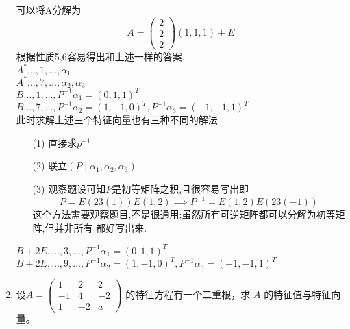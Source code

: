 \documentclass[12pt, a4paper, oneside, UTF8]{ctexbook}
\begin{document}
\begin{enumerate}
    \begin{solution}[分解为秩为1]
        可以将A分解为
        $$
        A=\begin{pmatrix}
            2 \\
            2 \\
            2
        \end{pmatrix}(1,1,1)+E
        $$
        根据性质5,6容易得出和上述一样的答案. \\  
        $A^*\ldots,1,\ldots,\alpha_1$ \\
        $A^*\ldots,7,\ldots,\alpha_2,\alpha_3$  \\
        $B\ldots,1,\ldots,P^{-1}\alpha_1=(0,1,1)^{T}$ \\
        $B\ldots,7,\ldots,P^{-1}\alpha_2=(1,-1,0)^T,P^{-1}\alpha_3=(-1,-1,1)^T$ \\ 
        此时求解上述三个特征向量也有三种不同的解法 
        \begin{enumerate}
            \item [(1)] 直接求$p^{-1}$
            \item [(2)] 联立$(P\mid \alpha_1,\alpha_2,\alpha_3)$ 
            \item [(3)] 观察题设可知$P$是初等矩阵之积,且很容易写出即
            $$
            P = E(23(1))E(1,2) \implies P^{-1}=E(1,2)E(23(-1))
            $$
            这个方法需要观察题目,不是很通用;虽然所有可逆矩阵都可以分解为初等矩阵,但并非所有
            都好写出来.
        \end{enumerate}
        $B+2E,\ldots,3,\ldots,P^{-1}\alpha_1=(0,1,1)^{T}$ \\
        $B+2E,\ldots,9,\ldots,P^{-1}\alpha_2=(1,-1,0)^T,P^{-1}\alpha_3=(-1,-1,1)^T$
    \end{solution}
    \item 设$
    A = \begin{pmatrix}
    1 & 2 & 2 \\
    -1 & 4 & -2 \\
    1 & -2 & a
    \end{pmatrix}$
    的特征方程有一个二重根，求 $A$ 的特征值与特征向量。
    

\end{enumerate}
\end{document}
